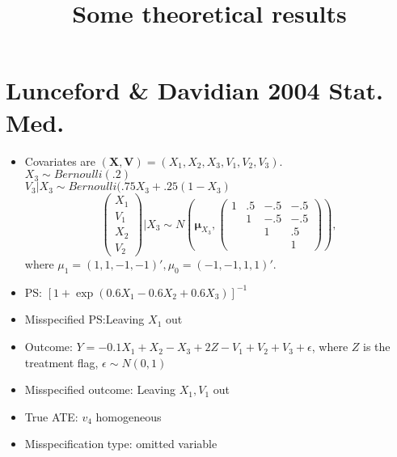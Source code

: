\documentclass{article}
\title{Some theoretical results}
\begin{document}
\section{Lunceford \& Davidian 2004 Stat. Med. \cite{Lunceford2004}}
\begin{itemize}
\item
Covariates are $(\mathbf{X, V}) = (X_1, X_2, X_3, V_1, V_2, V_3)$.  \\
$X_3 \sim Bernoulli(.2)$\\
$V_3 |X_3 \sim Bernoulli( .75X_3 +.25(1-X_3)$\\
\begin{displaymath}
\begin{pmatrix}X_1\\ V_1 \\X_2\\V_2  \end{pmatrix} | X_3 \sim 
N(\boldsymbol\mu_{X_3} , \begin{pmatrix}
	1 & .5 & -.5 & -.5\\
	   & 1 & -.5 & -.5 \\
	    &   & 1  & .5 \\
	    &  &   &  1
\end{pmatrix}),
\end{displaymath}
where $\mu_1 = (1, 1, -1, -1)', \mu_0 = (-1, -1, 1, 1)'$.
\item
PS:  $[ 1 + \exp( 0.6X_1 - 0.6X_2 + 0.6X_3)]^{-1}$
\item 
Misspecified PS:Leaving $X_1$ out
\item 
Outcome: $Y= -0.1X_1 + X_2 - X_3 + 2Z - V_1 + V_2 + V_3 + \epsilon$, where $Z$ is the treatment flag, $\epsilon \sim N(0,1)$
\item 
Misspecified outcome: Leaving $X_1, V_1$ out
\item True ATE: $v_4$ homogeneous
\item Misspecification type: omitted variable 
\end{itemize}
\end{document}
